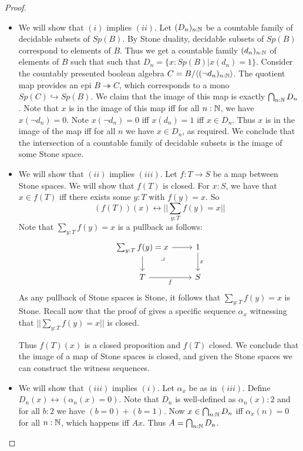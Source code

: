 \begin{proof}
  \begin{itemize}
    \item We will show that $(i)$ implies $(ii)$.
      Let $(D_n)_{n:\mathbb{N}}$ be a countable family of decidable subsets of $Sp(B)$. 
      By Stone duality, decidable subsets of $Sp(B)$ correspond to elements of $B$. 
      Thus we get a countable family $(d_n)_{n:\mathbb{N}}$ of elements of $B$ such that 
      such that $D_n = \{x:Sp(B)| x(d_n) = 1\}$. 
      Consider the countably presented boolean algebra 
      $C = B/\langle (\neg d_n)_{n:\mathbb{N}}\rangle$.
      The quotient map provides an epi $B\twoheadrightarrow C$, which 
      corresponds to a mono $Sp(C) \hookrightarrow Sp(B)$. 
      We claim that the image of this map is exactly $\bigcap_{n:\mathbb{N}} D_n$. 
      Note that $x$ is in the image of this map iff for all $n:\mathbb{N}$, we have 
      $x(\neg d_n) = 0$. Note $x(\neg d_n) = 0$ iff $x (d_n) = 1$ iff $x\in D_n$. 
      Thus $x$ is in the image of the map iff for all $n$ we have $x\in D_n$,
      as required. 
      We conclude that the intersection of a countable family of decidable subsets 
      is the image of some Stone space. 
    \item We will show that $(ii)$ implies $(iii)$.
    Let $f:T\to S$ be a map between Stone spaces. 
    We will show that $f(T)$ is closed. 
    For $x:S$, we have that $x\in f(T)$ iff there exists some $y:T$ 
    with $f(y) = x$. 
    So 
    \begin{equation}
      (f(T))(x) \leftrightarrow || \sum_{y:T} f(y) = x||
    \end{equation}
    Note that $\sum_{y:T} f(y) = x$ is a pullback as follows:
    \begin{equation}
      \begin{tikzcd}
        \sum_{y:T} f(y) = x\arrow[rd,"\lrcorner"{pos=0.125},phantom] \arrow[r] \arrow[d]
        & 1 \arrow[d,"x"] \\
        T \arrow[r,"f"']  & S
      \end{tikzcd}
    \end{equation}
    As any pullback of Stone spaces is Stone, it follows that 
    $\sum_{y:T} f(y) = x$ is Stone.
    Recall now that the proof of  
    gives a specific sequence $\alpha_x$ witnessing that $||\sum_{y:T} f(y) = x||$ is closed. 

    Thus $f(T)(x)$ is a closed proposition and $f(T)$ closed. 
    We conclude that the image of a map of Stone spaces is closed, 
    and given the Stone spaces we can construct the witness sequences. 
  \item We will show that $(iii)$ implies $(i)$. 
    Let $\alpha_x$ be as in $(iii)$. Define 
    $D_n(x) \leftrightarrow (\alpha_n(x) = 0)$. 
    Note that $D_n$ is well-defined as $\alpha_n(x):2$ and for all $b:2$ we have
    $(b=0)+ (b=1)$. Now $x \in \bigcap_{n:\mathbb{N}} D_n$ iff
    $\alpha_x(n) = 0$ for all $n:\mathbb{N}$, 
    which happens iff $A x$. Thus $A = \bigcap_{n:\mathbb{N}} D_n$. 
  \end{itemize} 
\end{proof} 

